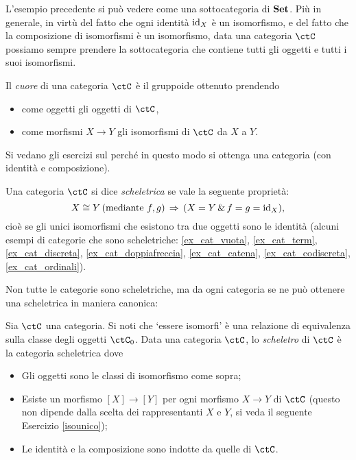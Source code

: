L'esempio precedente si può vedere come una sottocategoria di \(\mathbf{Set}\).
Più in generale, in virtù del fatto che ogni identità \(\mathrm{id}_X\) è un isomorfismo, e del fatto che la composizione di isomorfismi è un isomorfismo, data una categoria \(\ctC\) possiamo sempre prendere la sottocategoria che contiene tutti gli oggetti e tutti i suoi isomorfismi.
\begin{definition}\label{def_cuore}
	Il \emph{cuore} di una categoria \(\ctC\) è il gruppoide ottenuto prendendo
	\begin{itemize}
		\item come oggetti gli oggetti di \(\ctC\),
		\item come morfismi \(X\to Y\) gli isomorfismi di \(\ctC\) da \(X\) a \(Y\).
	\end{itemize}
\end{definition}

Si vedano gli esercizi sul perché in questo modo si ottenga una categoria (con identità e composizione).

\begin{definition}\label{def_cat_scheletrica}
	Una categoria \(\ctC\) si dice \emph{scheletrica} se vale la seguente proprietà:
	\[X\cong Y \, (\text{mediante } f,g) \,\Rightarrow\, (X=Y \,\&\, f=g=\mathrm{id}_X),\]
	cioè se gli unici isomorfismi che esistono tra due oggetti sono le identità (alcuni esempi di categorie che sono scheletriche: \ref{ex_cat_vuota}, \ref{ex_cat_term}, \ref{ex_cat_discreta}, \ref{ex_cat_doppiafreccia}, \ref{ex_cat_catena}, \ref{ex_cat_codiscreta}, \ref{ex_cat_ordinali}).
\end{definition}

Non tutte le categorie sono scheletriche, ma da ogni categoria se ne può ottenere una scheletrica in maniera canonica:

\begin{definition}\label{def_scheletro}
	Sia \(\ctC\) una categoria.	Si noti che `essere isomorfi' è una relazione di equivalenza sulla classe degli oggetti \(\ctC_0\).
	Data una categoria \(\ctC\), lo \emph{scheletro} di \(\ctC\) è la categoria scheletrica dove
	\begin{itemize}
		\item Gli oggetti sono le classi di isomorfismo come sopra;
		\item Esiste un morfismo \([X]\to[Y]\) per ogni morfismo \(X\to Y\) di \(\ctC\) (questo non dipende dalla scelta dei rappresentanti \(X\) e \(Y\), si veda il seguente Esercizio \ref{isounico});
		\item Le identità e la composizione sono indotte da quelle di \(\ctC\).
	\end{itemize}
\end{definition}


